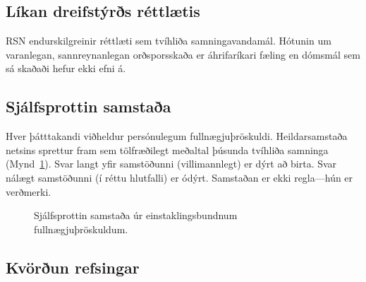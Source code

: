 \documentclass[11pt,a4paper,twocolumn]{article}
\begin{document}
\subsection{Líkan dreifstýrðs réttlætis}

RSN endurskilgreinir réttlæti sem tvíhliða samningavandamál. Hótunin um varanlegan, sannreynanlegan orðsporsskaða er áhrifaríkari fæling en dómsmál sem sá skaðaði hefur ekki efni á.

\subsection{Sjálfsprottin samstaða}

Hver þátttakandi viðheldur persónulegum fullnægjuþröskuldi. Heildarsamstaða netsins sprettur fram sem tölfræðilegt meðaltal þúsunda tvíhliða samninga (Mynd~\ref{fig:consensus}). Svar langt yfir samstöðunni (villimannlegt) er dýrt að birta. Svar nálægt samstöðunni (í réttu hlutfalli) er ódýrt. Samstaðan er ekki regla---hún er verðmerki.

\begin{figure}[ht]
\centering
{}
\caption{Sjálfsprottin samstaða úr einstaklingsbundnum fullnægjuþröskuldum.}
\label{fig:consensus}
\end{figure}

\subsection{Kvörðun refsingar}
\end{document}
